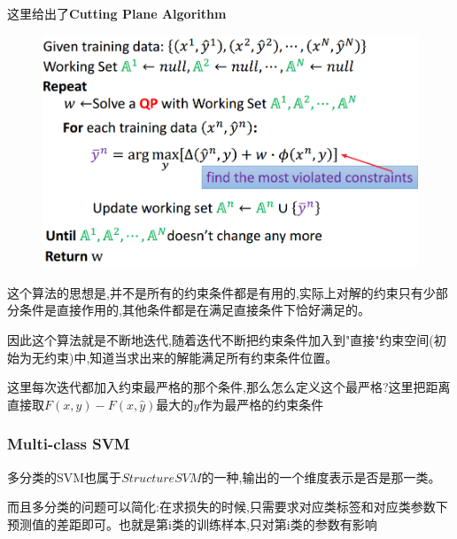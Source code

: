 \documentclass[UTF8,a4paper]{ctexart}
\begin{document}
        这里给出了\textbf{Cutting Plane Algorithm}
        \begin{figure}[H]
            \centering
            \includegraphics[scale = 0.3]{assets/ML_8a8b2.png}
        \end{figure}

        这个算法的思想是,并不是所有的约束条件都是有用的,实际上对解的约束只有少部分条件是直接作用的,其他条件都是在满足直接条件下恰好满足的。

        因此这个算法就是不断地迭代,随着迭代不断把约束条件加入到"直接"约束空间(初始为无约束)中,知道当求出来的解能满足所有约束条件位置。

        这里每次迭代都加入约束最严格的那个条件,那么怎么定义这个最严格?这里把距离直接取$F(x,y) - F(x,\hat y)$最大的$y$作为最严格的约束条件

            \subsubsection{Multi-class SVM}
            多分类的SVM也属于$Structure SVM$的一种,输出的一个维度表示是否是那一类。

            而且多分类的问题可以简化:在求损失的时候,只需要求对应类标签和对应类参数下预测值的差距即可。也就是第i类的训练样本,只对第i类的参数有影响
\end{document}
